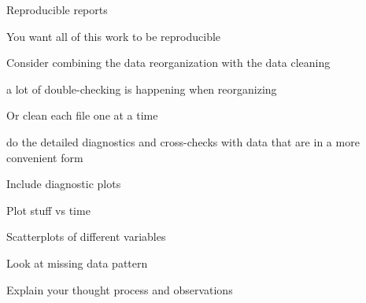 \documentclass[aspectratio=169,12pt,t]{beamer}
\begin{document}
\begin{frame}{Reproducible reports}

\bbi
\item You want all of this work to be reproducible
\item Consider combining the data reorganization with the data
  cleaning
  \bi
    \item a lot of double-checking is happening when reorganizing
  \ei
\item Or clean each file one at a time
  \bi
    \item do the detailed diagnostics and cross-checks with data that are
      in a more convenient form
  \ei
\item Include diagnostic plots
  \bi
    \item Plot stuff vs time
    \item Scatterplots of different variables
    \item Look at missing data pattern
  \ei
\item Explain your thought process and observations
  \ei

  \note{
  }
\end{frame}
\end{document}
